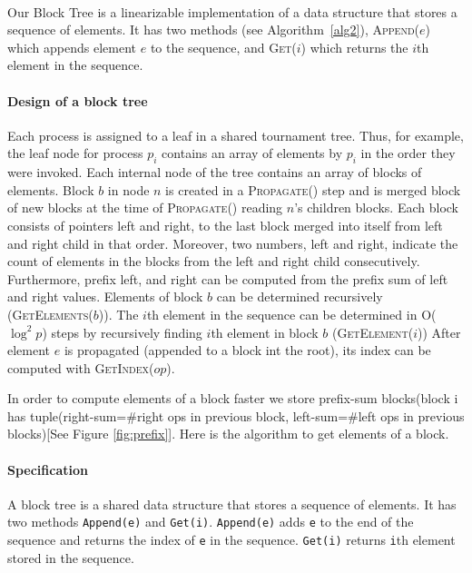 \documentclass[10pt]{article}
\theoremstyle{definition}
\begin{document}
\paragraph{}
Our Block Tree is a linearizable implementation of a data structure that stores a sequence of elements. It has two methods (see Algorithm~\ref{alg2}), \textsc{Append}($e$) which appends element $e$ to the sequence, and \textsc{Get}($i$) which returns the $i$th element in the sequence.

\paragraph{Design of a block tree}

Each process is assigned to a leaf in a shared tournament tree. Thus, for example, the leaf node for process $p_i$ contains an array of elements by $p_i$ in the order they were invoked.
Each internal node of the tree contains an array of blocks of elements.
Block $b$ in node $n$ is created in a \textsc{Propagate}() step and is merged block of new blocks at the time of \textsc{Propagate}() reading $n$'s children blocks. Each block consists of pointers left and right, to the last block merged into itself from left and right child in that order. Moreover, two numbers, left and right, indicate the count of elements in the blocks from the left and right child consecutively. Furthermore, prefix left, and right can be computed from the prefix sum of left and right values.
Elements of block $b$ can be determined recursively (\textsc{GetElements($b$)}).
The $i$th element in the sequence can be determined in \textsc{O}($\log^2 p$) steps by recursively finding $i$th element in block $b$ (\textsc{GetElement($i$)})
After element $e$ is propagated (appended to a block int the root), its index can be computed with \textsc{GetIndex}($op$).


In order to compute elements of a block faster we store prefix-sum blocks(block i has tuple(right-sum=$\#$right ops in previous block, left-sum=$\#$left ops in previous blocks)[See Figure \ref{fig:prefix}]. Here is the algorithm to get elements of a block.

\paragraph{Specification}
A block tree is a shared data structure that stores a sequence of elements.  It has two methods \texttt{Append(e)} and \texttt{Get(i)}. \texttt{Append(e)} adds \texttt{e} to the end of the sequence and returns the index of \texttt{e} in the sequence. \texttt{Get(i)} returns \texttt{i}th element stored in the sequence. 
\end{document}
